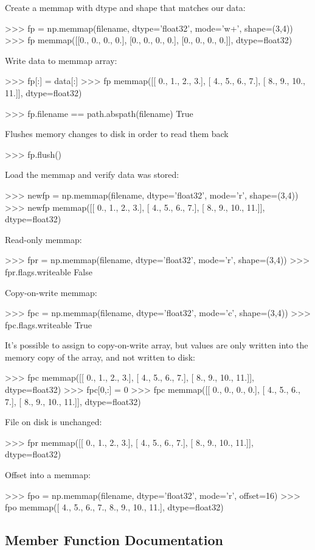\begin{DoxyVerb}
Create a memmap with dtype and shape that matches our data:

>>> fp = np.memmap(filename, dtype='float32', mode='w+', shape=(3,4))
>>> fp
memmap([[0., 0., 0., 0.],
        [0., 0., 0., 0.],
        [0., 0., 0., 0.]], dtype=float32)

Write data to memmap array:

>>> fp[:] = data[:]
>>> fp
memmap([[  0.,   1.,   2.,   3.],
        [  4.,   5.,   6.,   7.],
        [  8.,   9.,  10.,  11.]], dtype=float32)

>>> fp.filename == path.abspath(filename)
True

Flushes memory changes to disk in order to read them back

>>> fp.flush()

Load the memmap and verify data was stored:

>>> newfp = np.memmap(filename, dtype='float32', mode='r', shape=(3,4))
>>> newfp
memmap([[  0.,   1.,   2.,   3.],
        [  4.,   5.,   6.,   7.],
        [  8.,   9.,  10.,  11.]], dtype=float32)

Read-only memmap:

>>> fpr = np.memmap(filename, dtype='float32', mode='r', shape=(3,4))
>>> fpr.flags.writeable
False

Copy-on-write memmap:

>>> fpc = np.memmap(filename, dtype='float32', mode='c', shape=(3,4))
>>> fpc.flags.writeable
True

It's possible to assign to copy-on-write array, but values are only
written into the memory copy of the array, and not written to disk:

>>> fpc
memmap([[  0.,   1.,   2.,   3.],
        [  4.,   5.,   6.,   7.],
        [  8.,   9.,  10.,  11.]], dtype=float32)
>>> fpc[0,:] = 0
>>> fpc
memmap([[  0.,   0.,   0.,   0.],
        [  4.,   5.,   6.,   7.],
        [  8.,   9.,  10.,  11.]], dtype=float32)

File on disk is unchanged:

>>> fpr
memmap([[  0.,   1.,   2.,   3.],
        [  4.,   5.,   6.,   7.],
        [  8.,   9.,  10.,  11.]], dtype=float32)

Offset into a memmap:

>>> fpo = np.memmap(filename, dtype='float32', mode='r', offset=16)
>>> fpo
memmap([  4.,   5.,   6.,   7.,   8.,   9.,  10.,  11.], dtype=float32)\end{DoxyVerb}
 

\subsection{Member Function Documentation}
\mbox{\label{classnumpy_1_1core_1_1memmap_1_1memmap_afa78d47fbad8b8d586ff4207b698054f}} 
